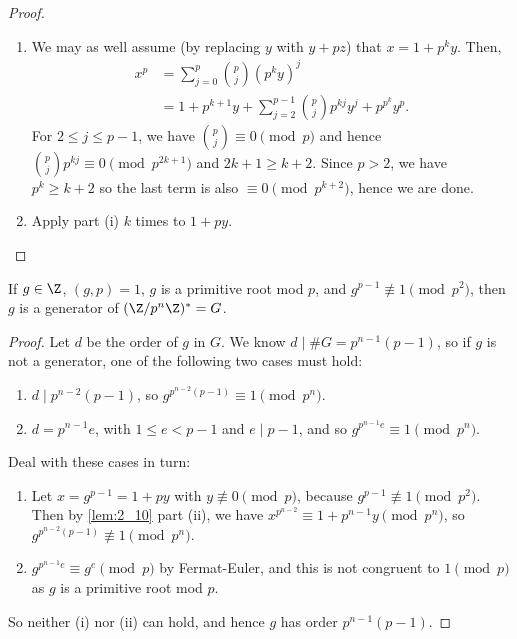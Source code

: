 \documentclass{article}
\begin{document}
\begin{proof}
    \leavevmode
    \begin{enumerate}[label=(\roman*)]
        \item We may as well assume (by replacing $y$ with $y + pz$) that $x = 1 + p^k y$. Then,
            \begin{align*}
                x^p &= \sum_{j=0}^p \binom{p}{j} (p^k y)^j \\
                    &= 1 + p^{k+1} y + \sum_{j=2}^{p-1} \binom{p}{j} p^{kj} y^j + p^{p^k} y^p.
            \end{align*}
            For $2 \leq j \leq p-1$, we have $\binom{p}{j} \equiv 0 \pmod{p}$ and hence $\binom{p}{j} p^{kj} \equiv 0 \pmod{p^{2k+1}}$ and $2k+1 \geq k+2$.
            Since $p > 2$, we have $p^k \geq k+2$ so the last term is also $\equiv 0 \pmod{p^{k+2}}$, hence we are done.

        \item Apply part (i) $k$ times to $1 + py$.
    \end{enumerate}
\end{proof}

\begin{nlemma}\label{lem:2_11}
    If $g \in \Z$, $(g, p) = 1$, $g$ is a primitive root mod $p$, and $g^{p-1} \not\equiv 1 \pmod{p^2}$, then $g$ is a generator of $(\Z/p^n \Z)^* = G$.
\end{nlemma}

\begin{proof}
    Let $d$ be the order of $g$ in $G$. We know $d \mid \#G = p^{n-1}(p-1)$, so if $g$ is not a generator, one of the following two cases must hold:

    \begin{enumerate}[label=(\roman*)]
        \item $d \mid p^{n-2} (p-1)$, so $g^{p^{n-2}(p-1)} \equiv 1 \pmod{p^n}$.
        \item $d = p^{n-1} e$, with $1 \leq e < p-1$ and $e \mid p-1$, and so $g^{p^{n-1} e} \equiv 1 \pmod{p^n}$.
    \end{enumerate}
    Deal with these cases in turn:

    \begin{enumerate}[label=(\roman*)]
        \item Let $x = g^{p-1} = 1+py$ with $y \not\equiv 0 \pmod{p}$, because $g^{p-1} \not\equiv 1 \pmod{p^2}$.
            Then by \cref{lem:2_10} part (ii), we have $x^{p^{n-2}} \equiv 1 + p^{n-1} y \pmod{p^n}$, so $g^{p^{n-2}(p-1)} \not\equiv 1 \pmod{p^n}$.

        \item $g^{p^{n-1}e} \equiv g^e \pmod{p}$ by Fermat-Euler, and this is not congruent to $1 \pmod{p}$ as $g$ is a primitive root mod $p$.
    \end{enumerate}

    So neither (i) nor (ii) can hold, and hence $g$ has order $p^{n-1}(p-1)$.
\end{proof}
\end{document}

